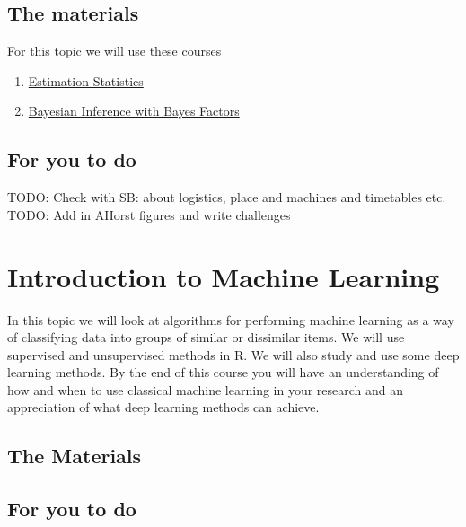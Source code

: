 \documentclass[
]{book}
\providecommand{\tightlist}{%
  \setlength{\itemsep}{0pt}\setlength{\parskip}{0pt}}
\begin{document}
\hypertarget{the-materials-3}{%
\section{The materials}\label{the-materials-3}}

For this topic we will use these courses

\begin{enumerate}
\def\labelenumi{\arabic{enumi}.}
\tightlist
\item
  \href{https://danmaclean.github.io/estimation_statistics/}{Estimation Statistics}
\item
  \href{https://danmaclean.github.io/bayes_factors/}{Bayesian Inference with Bayes Factors}
\end{enumerate}

\hypertarget{for-you-to-do-3}{%
\section{For you to do}\label{for-you-to-do-3}}

TODO: Check with SB: about logistics, place and machines and timetables etc.
TODO: Add in AHorst figures and write challenges

\hypertarget{introduction-to-machine-learning}{%
\chapter{Introduction to Machine Learning}\label{introduction-to-machine-learning}}

In this topic we will look at algorithms for performing machine learning as a way of classifying data into groups of similar or dissimilar items. We will use supervised and unsupervised methods in R. We will also study and use some deep learning methods. By the end of this course you will have an understanding of how and when to use classical machine learning in your research and an appreciation of what deep learning methods can achieve.

\hypertarget{the-materials-4}{%
\section{The Materials}\label{the-materials-4}}

\hypertarget{for-you-to-do-4}{%
\section{For you to do}\label{for-you-to-do-4}}
\end{document}
